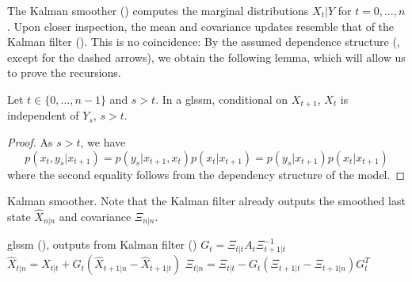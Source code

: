The Kalman smoother () computes the marginal distributions $X_{t} | Y$ for $t = 0, \dots, n$. Upon closer inspection, the mean and covariance updates resemble that of the Kalman filter (). This is no coincidence: By the assumed dependence structure (, except for the dashed arrows), we obtain the following lemma, which will allow us to prove the recursions.
\begin{lemma}
    Let $t \in \{0, \dots, n - 1\}$ and $s > t$. In a \acrshort{glssm}, conditional on $X_{t + 1}$, $X_{t}$ is independent of $Y_{s}$, $s > t$. 
\end{lemma}
\begin{proof}
    As $s > t$, we have
    $$
    p(x_{t}, y_{s} | x_{t + 1}) = p(y_{s}| x_{t + 1}, x_{t}) p(x_{t} | x_{t + 1}) = p(y_{s} | x_{t + 1}) p(x_{t} | x_{t + 1})
    $$
    where the second equality follows from the dependency structure of the model. 
\end{proof}
\begin{algorithm}
    \caption{Kalman smoother. Note that the Kalman filter already outputs the smoothed last state $\hat X_{n|n}$ and covariance $\Xi_{n|n}$.}
    \label{alg:kalman_smoother}
    \begin{algorithmic}[1]
        \Require \acrshort{glssm} (), outputs from Kalman filter ()
            \State $G_{t} = \Xi_{t|t} A_{t}\Xi_{t+1|t}^{-1}$
            \State $\hat X_{t | n} = \hat X_{t|t} + G_{t} \left( \hat X_{t + 1|n} - \hat X_{t + 1|t} \right)$
            \State $\Xi_{t|n} = \Xi_{t|t} - G_{t} \left( \Xi_{t + 1|t} - \Xi_{t + 1|n} \right)G_{t}^T$
        \EndFor
    \end{algorithmic}
\end{algorithm}


